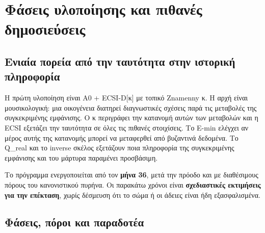 \documentclass[
  10pt,
  a4paper,
]{report}
\begin{document}
\chapter{Φάσεις υλοποίησης και πιθανές
δημοσιεύσεις}\label{ux3c6ux3acux3c3ux3b5ux3b9ux3c2-ux3c5ux3bbux3bfux3c0ux3bfux3afux3b7ux3c3ux3b7ux3c2-ux3baux3b1ux3b9-ux3c0ux3b9ux3b8ux3b1ux3bdux3adux3c2-ux3b4ux3b7ux3bcux3bfux3c3ux3b9ux3b5ux3cdux3c3ux3b5ux3b9ux3c2}

\section{Ενιαία πορεία από την ταυτότητα στην ιστορική
πληροφορία}\label{ux3b5ux3bdux3b9ux3b1ux3afux3b1-ux3c0ux3bfux3c1ux3b5ux3afux3b1-ux3b1ux3c0ux3cc-ux3c4ux3b7ux3bd-ux3c4ux3b1ux3c5ux3c4ux3ccux3c4ux3b7ux3c4ux3b1-ux3c3ux3c4ux3b7ux3bd-ux3b9ux3c3ux3c4ux3bfux3c1ux3b9ux3baux3ae-ux3c0ux3bbux3b7ux3c1ux3bfux3c6ux3bfux3c1ux3afux3b1}

Η πρώτη υλοποίηση είναι A0 + ECSI-D{[}κ{]} με τοπικό Znamenny κ. Η αρχή
είναι μουσικολογική: μια οικογένεια διατηρεί διαγνωστικές σχέσεις παρά
τις μεταβολές της συγκεκριμένης εμφάνισης. Ο κ περιγράφει την κατανομή
αυτών των μεταβολών και η ECSI εξετάζει την ταυτότητα σε όλες τις
πιθανές στοιχίσεις. Το E-min ελέγχει αν μέρος αυτής της κατανομής μπορεί
να μεταφερθεί από βυζαντινά δεδομένα. Το Q\_real και το inverse σκέλος
εξετάζουν ποια πληροφορία της συγκεκριμένης εμφάνισης και του μάρτυρα
παραμένει προσβάσιμη.

Το πρόγραμμα ενεργοποιείται από τον \textbf{μήνα 36}, μετά την πρόοδο
και με διαθέσιμους πόρους του κανονιστικού πυρήνα. Οι παρακάτω χρόνοι
είναι \textbf{σχεδιαστικές εκτιμήσεις για την επέκταση}, χωρίς δέσμευση
ότι το σώμα ή οι άδειες είναι ήδη εξασφαλισμένα.

\section{Φάσεις, πόροι και
παραδοτέα}\label{ux3c6ux3acux3c3ux3b5ux3b9ux3c2-ux3c0ux3ccux3c1ux3bfux3b9-ux3baux3b1ux3b9-ux3c0ux3b1ux3c1ux3b1ux3b4ux3bfux3c4ux3adux3b1}
\end{document}

